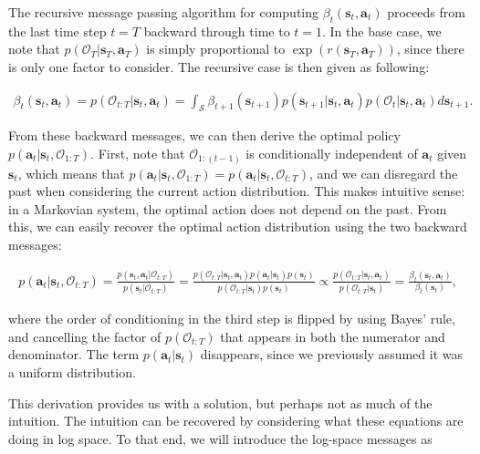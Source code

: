 The recursive message passing algorithm for computing $\beta_t(\mathbf{s}_t,\mathbf{a}_t)$ proceeds from the last time step $t=T$ backward through time to $t=1$. In the base case, we note that $p(\mathcal{O}_T|\mathbf{s}_T,\mathbf{a}_T)$ is simply proportional to $\exp(r(\mathbf{s}_T,\mathbf{a}_T))$, since there is only one factor to consider. The recursive case is then given as following:

\begin{align}
\beta_t(\mathbf{s}_t,\mathbf{a}_t) = p(\mathcal{O}_{t:T}|\mathbf{s}_t,\mathbf{a}_t) = \int_{\mathcal{S}} \beta_{t+1}(\mathbf{s}_{t+1}) p(\mathbf{s}_{t+1}|\mathbf{s}_t,\mathbf{a}_t) p(\mathcal{O}_t|\mathbf{s}_t,\mathbf{a}_t) d\mathbf{s}_{t+1}.\label{eq:betabackup}
\end{align}

From these backward messages, we can then derive the optimal policy $p(\mathbf{a}_t|\mathbf{s}_t,\mathcal{O}_{1:T})$. First, note that $\mathcal{O}_{1:(t-1)}$ is conditionally independent of $\mathbf{a}_t$ given $\mathbf{s}_t$, which means that $p(\mathbf{a}_t|\mathbf{s}_t,\mathcal{O}_{1:T})=p(\mathbf{a}_t|\mathbf{s}_t,\mathcal{O}_{t:T})$, and we can disregard the past when considering the current action distribution. This makes intuitive sense: in a Markovian system, the optimal action does not depend on the past. From this, we can easily recover the optimal action distribution using the two backward messages:

\begin{align}
p(\mathbf{a}_t|\mathbf{s}_t,\mathcal{O}_{t:T}) = \frac{p(\mathbf{s}_t,\mathbf{a}_t|\mathcal{O}_{t:T})}{p(\mathbf{s}_t|\mathcal{O}_{t:T})} =
\frac{p(\mathcal{O}_{t:T}|\mathbf{s}_t,\mathbf{a}_t)p(\mathbf{a}_t|\mathbf{s}_t)p(\mathbf{s}_t)}{p(\mathcal{O}_{t:T}|\mathbf{s}_t)p(\mathbf{s}_t)} \propto
\frac{p(\mathcal{O}_{t:T}|\mathbf{s}_t,\mathbf{a}_t)}{p(\mathcal{O}_{t:T}|\mathbf{s}_t)} =
\frac{\beta_t(\mathbf{s}_t,\mathbf{a}_t)}{\beta_t(\mathbf{s}_t)}, \nonumber
\end{align}

where the order of conditioning in the third step is flipped by using Bayes' rule, and cancelling the factor of $p(\mathcal{O}_{t:T})$ that appears in both the numerator and denominator. The term $p(\mathbf{a}_t|\mathbf{s}_t)$ disappears, since we previously assumed it was a uniform distribution.

This derivation provides us with a solution, but perhaps not as much of the intuition. The intuition can be recovered by considering what these equations are doing in log space. To that end, we will introduce the log-space messages as

